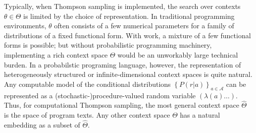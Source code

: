 \documentclass{article} %
\newcommand{\Acal}{\mathcal{A}}
\newcommand{\br}[1]{\left\{ #1 \right\}}
\begin{document}
Typically, when Thompson sampling is implemented, the search over contexts $\theta \in \Theta$ is limited by the choice of representation.
In traditional programming environments, $\theta$ often consists of a few numerical parameters for a family of distributions of a fixed functional form.
With work, a mixture of a few functional forms is possible; but without probabilistic programming machinery, implementing a rich context space $\Theta$ would be an unworkably large technical burden.
In a probabilstic programing language, however, the representation of heterogeneously structured or infinite-dimensional context spaces is quite natural.
Any computable model of the conditional distributions $\br{P(r|a)}_{a \in \Acal}$ can be represented as a (stochastic-)procedure-valued random variable $(\lambda (a) \ldots)$.
Thus, for computational Thompson sampling, the most general context space $\widehat\Theta$ is the space of program texts.
Any other context space $\Theta$ has a natural embedding as a subset of $\widehat\Theta$.
\end{document}
